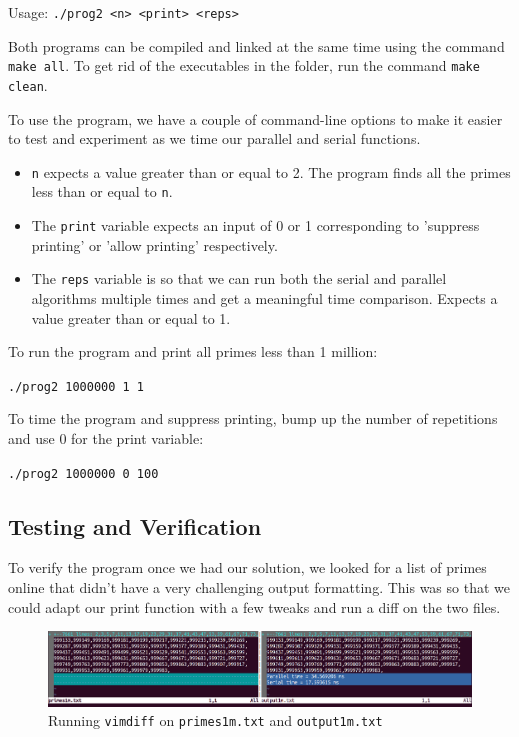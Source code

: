 \documentclass{article}
\begin{document}
\noindent
Usage: \texttt{./prog2 <n> <print> <reps>}

\medskip
\noindent
Both programs can be compiled and linked at the same time using the command \texttt{make all}. To get rid of the executables in the folder, run the command \texttt{make clean}.

\medskip
\noindent
To use the program, we have a couple of command-line options to make it easier to test and experiment as we time our parallel and serial functions. 
\begin{itemize}
    \item \texttt{n} expects a value greater than or equal to 2. The program finds all the primes less than or equal to \texttt{n}.
    
    \item The \texttt{print} variable expects an input of 0 or 1 corresponding to 'suppress printing' or 'allow printing' respectively.
    
    \item The \texttt{reps} variable is so that we can run both the serial and parallel algorithms multiple times and get a meaningful time comparison. Expects a value greater than or equal to 1.
\end{itemize}

\noindent
To run the program and print all primes less than 1 million:

\texttt{./prog2 1000000 1 1}

\noindent
To time the program and suppress printing, bump up the number of repetitions and use 0 for the print variable:

\texttt{./prog2 1000000 0 100}

\subsection{Testing and Verification}
To verify the program once we had our solution, we looked for a list of primes online that didn't have a very challenging output formatting. This was so that we could adapt our print function with a few tweaks and run a diff on the two files.

\begin{figure}[ht]
    \centering
    \includegraphics[width=\textwidth]{vimdiff.png}
    \caption{Running \texttt{vimdiff} on \texttt{primes1m.txt} and \texttt{output1m.txt}}
    \label{fig:vimdiff}
\end{figure}
\end{document}
